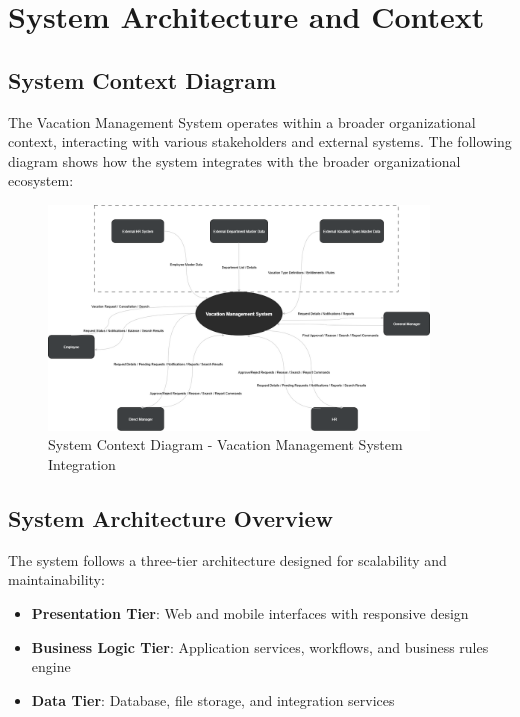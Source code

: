 \documentclass[12pt,a4paper]{article}
\begin{document}
\section{System Architecture and Context}

\subsection{System Context Diagram}
The Vacation Management System operates within a broader organizational context, interacting with various stakeholders and external systems. The following diagram shows how the system integrates with the broader organizational ecosystem:

\begin{figure}[H]
\centering
\includegraphics[width=0.9\textwidth]{Diagrams/Context/context.drawio.png}
\caption{System Context Diagram - Vacation Management System Integration}
\label{fig:context}
\end{figure}

\subsection{System Architecture Overview}
The system follows a three-tier architecture designed for scalability and maintainability:

\begin{itemize}
    \item \textbf{Presentation Tier}: Web and mobile interfaces with responsive design
    \item \textbf{Business Logic Tier}: Application services, workflows, and business rules engine
    \item \textbf{Data Tier}: Database, file storage, and integration services
\end{itemize}
\end{document}
